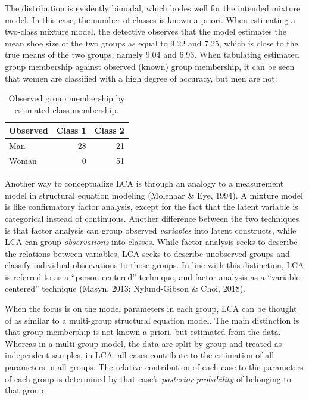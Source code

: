 \documentclass[
  ,man,floatsintext]{apa6}
\begin{document}
The distribution is evidently bimodal, which bodes well for the intended
mixture model. In this case, the number of classes is known a priori.
When estimating a two-class mixture model, the detective observes that
the model estimates the mean shoe size of the two groups as equal to
9.22 and
7.25, which is close to the true
means of the two groups, namely 9.04
and 6.93. When tabulating estimated
group membership against observed (known) group membership, it can be
seen that women are classified with a high degree of accuracy, but men
are not:

\begin{table}

\caption{\label{tab:tabshoe}Observed group membership by estimated class membership.}
\centering
\begin{tabular}[t]{l|r|r}
\hline
Observed & Class 1 & Class 2\\
\hline
Man & 28 & 21\\
\hline
Woman & 0 & 51\\
\hline
\end{tabular}
\end{table}

Another way to conceptualize LCA is through an analogy to a measurement model in structural equation modeling (Molenaar \& Eye, 1994).
A mixture model is like confirmatory factor analysis,
except for the fact that the latent variable is categorical instead of continuous.
Another difference between the two techniques is that factor analysis can group observed \emph{variables} into latent constructs, while LCA can group \emph{observations} into classes.
While factor analysis seeks to describe the relations between variables,
LCA seeks to describe unobserved groups and classify individual observations to those groups.
In line with this distinction, LCA is referred to as a ``person-centered'' technique, and
factor analysis as a ``variable-centered'' technique
(Masyn, 2013; Nylund-Gibson \& Choi, 2018).

When the focus is on the model parameters in each group, LCA can be
thought of as similar to a multi-group structural equation model. The
main distinction is that group membership is not known a priori, but estimated from the data.
Whereas in a multi-group model, the data are split by group and treated
as independent samples, in LCA, all cases contribute to the estimation
of all parameters in all groups. The relative contribution of each case
to the parameters of each group is determined by that case's \emph{posterior
probability} of belonging to that group.
\end{document}
